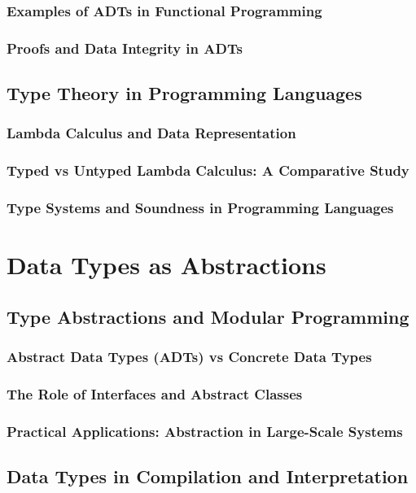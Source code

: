 \documentclass[12pt, oneside]{book}
\begin{document}
\subsubsection{Examples of ADTs in Functional Programming}
\subsubsection{Proofs and Data Integrity in ADTs}
\subsection{Type Theory in Programming Languages}
\subsubsection{Lambda Calculus and Data Representation}
\subsubsection{Typed vs Untyped Lambda Calculus: A Comparative Study}
\subsubsection{Type Systems and Soundness in Programming Languages}

\section{Data Types as Abstractions}
\subsection{Type Abstractions and Modular Programming}
\subsubsection{Abstract Data Types (ADTs) vs Concrete Data Types}
\subsubsection{The Role of Interfaces and Abstract Classes}
\subsubsection{Practical Applications: Abstraction in Large-Scale Systems}
\subsection{Data Types in Compilation and Interpretation}
\end{document}
